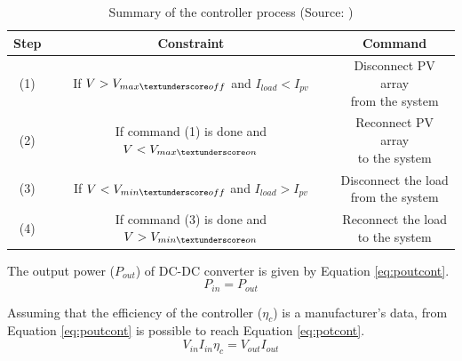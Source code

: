 \documentclass[journal]{IEEEtran}
\begin{document}
\begin{table}[!t]
\renewcommand{\arraystretch}{1.3}
\caption{Summary of the controller process (Source: \cite{Hansen})}
\label{table:controller}
\centering
\begin{tabular}{c | c | c }
\hline
\hline
Step  & Constraint & Command\\
\hline
\hline
(1) & \makecell{If $V > V_{max \textunderscore off}$ \\and $I_{load} < I_{pv}$} & \makecell{Disconnect PV array \\from the system}\\
\hline
(2) & \makecell{If command (1) is \\done and $V < V_{max \textunderscore on}$} & \makecell{Reconnect PV array \\to the system}\\
\hline
(3) & \makecell{If $V < V_{min \textunderscore off}$ and \\ $I_{load} > I_{pv}$} & \makecell{Disconnect the load \\from the system}\\
\hline
(4) & \makecell{If command (3) is \\ done and $V > V_{min \textunderscore on}$} & \makecell{Reconnect the load \\to the system}\\
\hline
\hline
\end{tabular}
\end{table}

%
The output power ($ P_{out} $) of DC-DC converter is given by Equation \ref{eq:poutcont}. 
\begin{equation}
\label{eq:poutcont}
P_{in} = P_{out}
\end{equation}

Assuming that the efficiency of the controller ($ \eta_{c} $) is a manufacturer's data, from Equation \ref{eq:poutcont} is possible to reach Equation \ref{eq:potcont}.
\begin{equation}
\label{eq:potcont}
V_{in} I_{in} \eta_{c} = V_{out} I_{out}
\end{equation}
\end{document}
